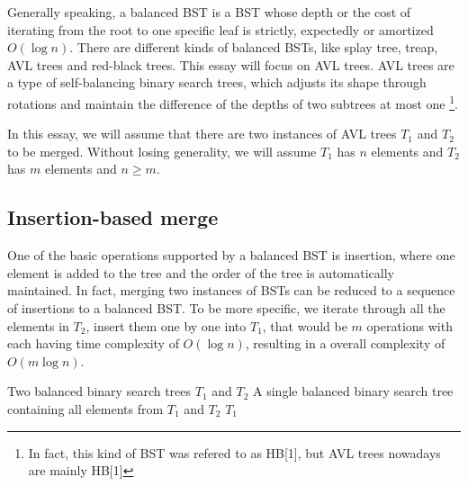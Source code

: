 \documentclass[12pt]{article}
\begin{document}
Generally speaking, a balanced BST is a BST whose depth or the cost of iterating from the root to one specific leaf is strictly, expectedly or amortized $O(\log n)$. There are different kinds of balanced BSTs, like splay tree, treap, AVL trees and red-black trees. This essay will focus on AVL trees. AVL trees are a type of self-balancing binary search trees, which adjusts its shape through rotations and maintain the difference of the depths of two subtrees at most one \cite{avl}\footnote{In fact, this kind of BST was refered to as HB[1], but AVL trees nowadays are mainly HB[1]}. 


In this essay, we will assume that there are two instances of AVL trees $T_1$ and $T_2$ to be merged. Without losing generality, we will assume $T_1$ has $n$ elements and $T_2$ has $m$ elements and $n \ge m$.



\subsection{Insertion-based merge}

One of the basic operations supported by a balanced BST is insertion, where one element is added to the tree and the order of the tree is automatically maintained. In fact, merging two instances of BSTs can be reduced to a sequence of insertions to a balanced BST. To be more specific, we iterate through all the elements in $T_2$, insert them one by one into $T_1$, that would be $m$ operations with each having time complexity of $O(\log n)$, resulting in a overall complexity of $O(m\log n)$. 

\begin{tcolorbox}[colback=orange!5!white, colframe=orange!75!black, title=Algorithm: Insertion-Based Merge]
\begin{algorithmic}[1]
\Require Two balanced binary search trees $T_1$ and $T_2$
\Ensure A single balanced binary search tree containing all elements from $T_1$ and $T_2$
        \State {}
    \EndFor
    \State \Return $T_1$
\EndProcedure
\end{algorithmic}
\end{tcolorbox}
\end{document}
